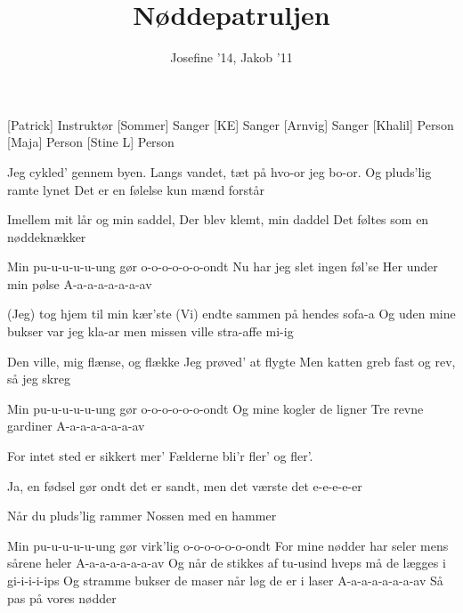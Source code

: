 \documentclass[a4paper,11pt]{article}
\title{Nøddepatruljen}
\author{Josefine '14, Jakob '11}
\begin{document}
\maketitle

\begin{roles}
[Patrick] Instruktør
[Sommer] Sanger
[KE] Sanger
[Arnvig] Sanger
[Khalil] Person
[Maja] Person
[Stine L] Person
\end{roles}

\begin{song}
 Jeg cykled' gennem byen.
Langs vandet, tæt på hvo-or jeg bo-or.
Og pluds'lig ramte lynet
Det er en følelse kun mænd forstår

Imellem mit lår og min saddel,
Der blev klemt, min daddel
Det føltes som en nøddeknækker

 Min pu-u-u-u-u-ung
gør o-o-o-o-o-o-ondt
 Nu har jeg slet ingen føl'se
Her under min pølse
 A-a-a-a-a-a-a-av

 (Jeg) tog hjem til min kær'ste
(Vi) endte sammen på hendes sofa-a
Og uden mine bukser var jeg kla-ar
men missen ville stra-affe mi-ig

Den ville, mig flænse, og flække
Jeg prøved' at flygte
Men katten greb fast og rev, så jeg skreg

 Min pu-u-u-u-u-ung
gør o-o-o-o-o-o-ondt
 Og mine kogler de ligner
Tre revne gardiner
 A-a-a-a-a-a-a-av

 For intet sted er sikkert mer'
Fælderne bli'r fler' og fler'.

Ja, en fødsel gør ondt
det er sandt, men det værste det e-e-e-e-er

Når du pluds'lig rammer
Nossen med en hammer

 Min pu-u-u-u-u-ung
gør virk'lig o-o-o-o-o-o-ondt
 For mine nødder har seler
mens sårene heler
 A-a-a-a-a-a-a-av
 Og når de stikkes af tu-usind hveps
må de lægges i gi-i-i-i-ips
 Og stramme bukser de maser
når løg de er i laser
 A-a-a-a-a-a-a-av
Så pas på vores nødder
\end{song}
\end{document}
